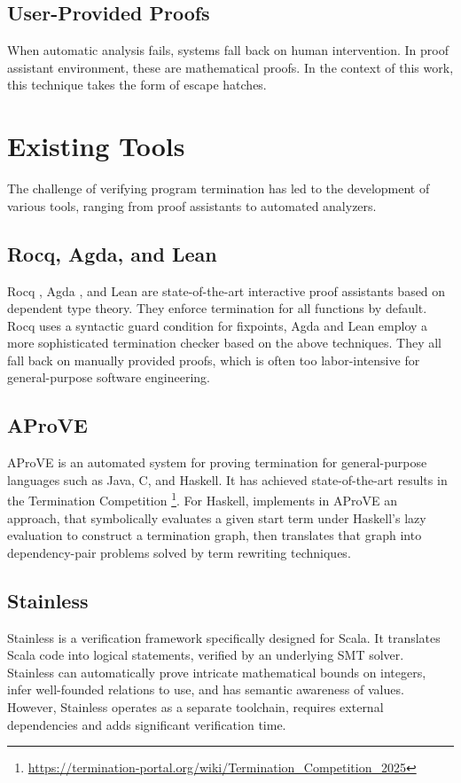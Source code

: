 \subsection{User-Provided Proofs}
When automatic analysis fails, systems fall back on human intervention. In proof
assistant environment, these are mathematical proofs. In the context of this
work, this technique takes the form of escape hatches.

\section{Existing Tools}
The challenge of verifying program termination has led to the development of
various tools, ranging from proof assistants to automated analyzers.

\subsection{Rocq, Agda, and Lean}
Rocq \cite{rocq}, Agda \cite{agda}, and Lean \cite{lean}
are state-of-the-art interactive proof assistants based on dependent type
theory. They enforce termination for all functions by default.
Rocq uses a syntactic guard condition for fixpoints, Agda and Lean employ a more
sophisticated termination checker based on the above techniques.
They all fall back on manually provided proofs, which is often too
labor-intensive for general-purpose software engineering.

\subsection{AProVE}
AProVE \cite{AProVE} is an automated system for proving termination for
general-purpose languages such as Java, C, and Haskell. It has achieved
state-of-the-art results in the Termination Competition
\footnote{\url{https://termination-portal.org/wiki/Termination_Competition_2025}}.
For Haskell, \cite{AProVEHaskell} implements in AProVE an approach, that
symbolically evaluates a given start term under Haskell's lazy evaluation to
construct a termination graph, then translates that graph into dependency-pair
problems solved by term rewriting techniques.

\subsection{Stainless}
Stainless \cite{DBLP:journals/corr/abs-1904-03482} is a verification framework
specifically designed for Scala. It translates Scala code into logical
statements, verified by an underlying SMT solver. Stainless can automatically
prove intricate mathematical bounds on integers, infer well-founded relations to
use, and has semantic awareness of values. However, Stainless operates as a
separate toolchain, requires external dependencies and adds significant
verification time.

